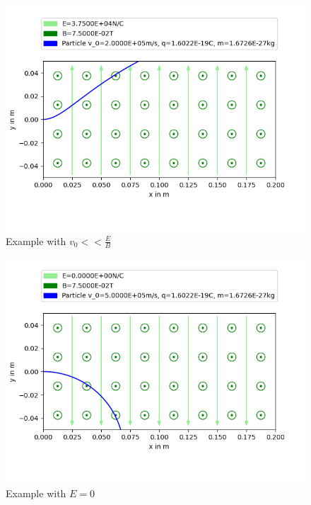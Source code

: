 \documentclass[a4paper, 10pt]{article}
\begin{document}
\begin{figure}[ht]
\caption{Example with $v_0<<\frac{E}{B}$}
\centering
\includegraphics[width=\textwidth]{figure_5}
\end{figure}
\begin{figure}[ht]
\caption{Example with $E=0$}
\centering
\includegraphics[width=\textwidth]{figure_6}
\end{figure}
\end{document}
